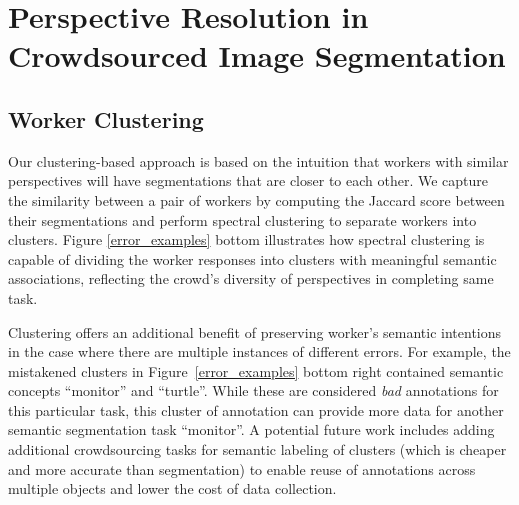 \section{Perspective Resolution in Crowdsourced Image Segmentation}
\subsection{Worker Clustering}
Our clustering-based approach is based on the intuition that workers with similar perspectives  will have segmentations that are closer to each other. We capture the similarity between a pair of workers by computing the Jaccard score between their segmentations and perform spectral clustering to separate workers into clusters. Figure \ref{error_examples} bottom illustrates how spectral clustering is capable of dividing the worker responses into clusters with meaningful semantic associations, reflecting the crowd's diversity of perspectives in completing same task.
\par Clustering offers an additional benefit of preserving worker's semantic intentions in the case where there are multiple instances of different errors. For example, the mistakened clusters in Figure~\ref{error_examples} bottom right contained semantic concepts ``monitor'' and ``turtle''. While these are considered \textit{bad} annotations for this particular task, this cluster of annotation can provide more data for another semantic segmentation task ``monitor''. A potential future work includes adding additional crowdsourcing tasks for semantic labeling of clusters (which is cheaper and more accurate than segmentation) to enable reuse of annotations across multiple objects and lower the cost of data collection. 